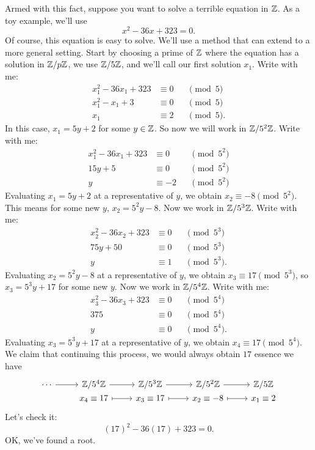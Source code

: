 \documentclass{ximera}
\begin{document}
Armed with this fact, suppose you want to solve a terrible equation in
$\mathbb Z$. As a toy example, we'll use
\[
x^2-36 x+323 = 0.
\]
Of course, this equation is easy to solve. We'll use a method that can
extend to a more general setting. Start by choosing a prime of $\mathbb Z$
where the equation has a solution in $\mathbb Z/p \mathbb Z$, we use $\mathbb Z/5\mathbb Z$, and
we'll call our first solution $x_1$. Write with me:
\begin{align*}
  x_1^2- 36x_1 + 323 &\equiv 0 &&\pmod{5}\\
  x_1^2 - x_1 + 3 &\equiv 0 &&\pmod{5}\\
  x_1 &\equiv 2&&\pmod{5}.
\end{align*}
In this case, $x_1 = 5y + 2$ for some $y\in \mathbb Z$. So now we will work
in $\mathbb Z/5^2\mathbb Z$. Write with me:
\begin{align*}
  x_1^2- 36x_1 + 323 &\equiv 0&&\pmod{5^2}\\
  15y+5 &\equiv 0 &&\pmod{5^2}\\
  y &\equiv -2 &&\pmod{5^2}
\end{align*}
Evaluating $x_1 = 5y+2$ at a representative of $y$, we obtain $x_2
\equiv -8 \pmod{5^2}$. This means for some new $y$, $x_2 = 5^2 y
-8$. Now we work in $\mathbb Z/5^3\mathbb Z$. Write with me:
\begin{align*}
  x_2^2- 36x_2 + 323 &\equiv 0&&\pmod{5^3}\\
  75y+50 &\equiv 0 &&\pmod{5^3}\\
  y &\equiv 1 &&\pmod{5^3}.
\end{align*}
Evaluating $x_2 = 5^2 y-8$ at a representative of $y$, we obtain $x_3
\equiv 17\pmod{5^3}$, so $x_3 = 5^3y+17$ for some new $y$. Now we work
in $\mathbb Z/5^4\mathbb Z$. Write with me:
\begin{align*}
  x_3^2- 36x_3 + 323 &\equiv 0 &&\pmod{5^4}\\
  375 &\equiv 0 &&\pmod{5^4}\\
  y &\equiv 0 &&\pmod{5^4}.
\end{align*}
Evaluating $x_3 = 5^3 y+17$ at a representative of $y$, we obtain $x_4
\equiv 17 \pmod{5^4}$.  We claim that continuing this process, we
would always obtain $17$ essence we have
\[
\begin{tikzcd}[row sep=0em,]
  \cdots \ar[r] & \Z/5^4\Z \ar[r] & \Z/5^3\Z \ar[r] & \Z/5^2\Z \ar[r] & \Z/5\Z \\
  & x_4\equiv 17 \ar[r,mapsto] & x_3\equiv 17 \ar[r,mapsto] & x_2\equiv -8 \ar[r,mapsto] &  x_1\equiv 2
\end{tikzcd}
\]
Let's check it:  
\[
(17)^2-36 (17)+323 = 0.
\]
OK, we've found a root.
\end{document}
